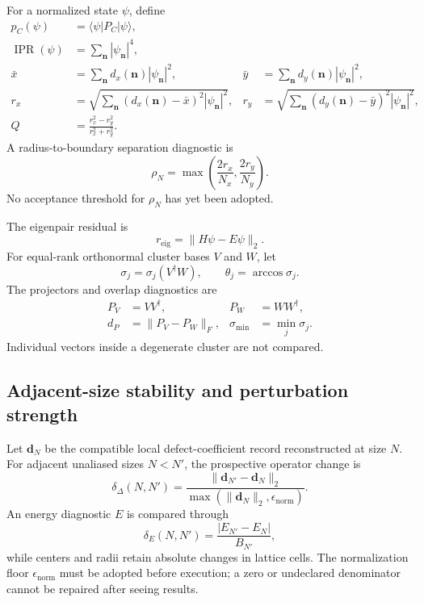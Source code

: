 \documentclass[11pt]{article}
\begin{document}
For a normalized state $\psi$, define
\begin{align}
  p_C(\psi)&=\langle\psi|P_C|\psi\rangle,\\
  \operatorname{IPR}(\psi)&=\sum_{\mathbf n}|\psi_{\mathbf n}|^4,\\
  \bar x&=\sum_{\mathbf n}d_x(\mathbf n)|\psi_{\mathbf n}|^2,
  &\bar y&=\sum_{\mathbf n}d_y(\mathbf n)|\psi_{\mathbf n}|^2,\\
  r_x&=\sqrt{\sum_{\mathbf n}(d_x(\mathbf n)-\bar x)^2
                 |\psi_{\mathbf n}|^2},
  &r_y&=\sqrt{\sum_{\mathbf n}(d_y(\mathbf n)-\bar y)^2
                 |\psi_{\mathbf n}|^2},\\
  Q&=\frac{r_x^2-r_y^2}{r_x^2+r_y^2}.
  \label{eq:state-localization-diagnostics}
\end{align}
A radius-to-boundary separation diagnostic is
\begin{equation}
  \rho_N=\max\!\left(\frac{2r_x}{N_x},\frac{2r_y}{N_y}\right).
  \label{eq:radius-boundary-ratio}
\end{equation}
No acceptance threshold for $\rho_N$ has yet been adopted.

The eigenpair residual is
\begin{equation}
  r_{\mathrm{eig}}=\lVert H\psi-E\psi\rVert_2.
\end{equation}
For equal-rank orthonormal cluster bases $V$ and $W$, let
\begin{equation}
  \sigma_j=\sigma_j(V^{\dagger}W),
  \qquad
  \theta_j=\arccos\sigma_j.
\end{equation}
The projectors and overlap diagnostics are
\begin{align}
  P_V&=VV^{\dagger},&P_W&=WW^{\dagger},\\
  d_P&=\lVert P_V-P_W\rVert_F,
  &\sigma_{\min}&=\min_j\sigma_j.
  \label{eq:projector-diagnostics}
\end{align}
Individual vectors inside a degenerate cluster are not compared.

\subsection{Adjacent-size stability and perturbation strength}

Let $\mathbf d_N$ be the compatible local defect-coefficient record reconstructed at
size $N$.  For adjacent unaliased sizes $N<N'$, the prospective operator change is
\begin{equation}
  \delta_{\Delta}(N,N')
  =\frac{\lVert\mathbf d_{N'}-\mathbf d_N\rVert_2}
  {\max(\lVert\mathbf d_N\rVert_2,\epsilon_{\mathrm{norm}})}.
  \label{eq:adjacent-operator-change}
\end{equation}
An energy diagnostic $E$ is compared through
\begin{equation}
  \delta_E(N,N')
  =\frac{|E_{N'}-E_N|}{B_{N'}},
  \label{eq:adjacent-energy-change}
\end{equation}
while centers and radii retain absolute changes in lattice cells.  The normalization
floor $\epsilon_{\mathrm{norm}}$ must be adopted before execution; a zero or undeclared
denominator cannot be repaired after seeing results.
\end{document}
